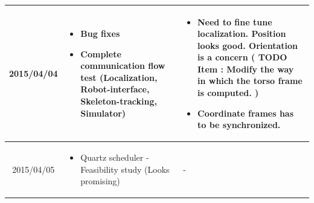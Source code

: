 \documentclass[11pt]{article} %
\begin{document}
\begin{center}
\begin{longtable}{ | c | p{6cm} | p{5cm} |}
	 2015/04/04         & 
  \begin{itemize}
  \item Bug fixes
  \item Complete communication flow test (Localization, Robot-interface, Skeleton-tracking, Simulator)
\end{itemize}   
  & 
\begin{itemize}
\item Need to fine tune localization. Position looks good. Orientation is a concern ( TODO Item : Modify the way in which the torso frame is computed. )
\item Coordinate frames has to be synchronized.
\end{itemize}			\\					 \hline  	

2015/04/05         & 
  \begin{itemize}
  \item Quartz scheduler - Feasibility study (Looks promising)
\end{itemize}   
  & 
-  					\\					 \hline  										 
  										   										 
    \end{longtable}
\end{center}
\end{document}
